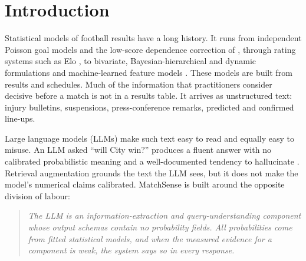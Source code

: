 \documentclass[11pt,a4paper]{article}
\begin{document}
\tableofcontents
\newpage

\section{Introduction}\label{sec:intro}

Statistical models of football results have a long history. It runs from
independent Poisson goal models \citep{maher1982} and the low-score dependence
correction of \citet{dixon1997}, through rating systems such as Elo
\citep{elo1978,hvattum2010}, to bivariate, Bayesian-hierarchical and dynamic
formulations \citep{karlis2003,rue2000,baio2010,koopman2015} and machine-learned
feature models \citep{hubacek2019,bunker2019}. These models are built from
results and schedules. Much of the information that practitioners consider
decisive before a match is not in a results table. It arrives as unstructured
text: injury bulletins, suspensions, press-conference remarks, predicted and
confirmed line-ups.

Large language models (LLMs) make such text easy to read and equally easy to
misuse. An LLM asked ``will City win?'' produces a fluent answer with no
calibrated probabilistic meaning and a well-documented tendency to hallucinate
\citep{ji2023}. Retrieval augmentation \citep{lewis2020} grounds the text the
LLM sees, but it does not make the model's numerical claims calibrated.
MatchSense is built around the opposite division of labour:

\begin{quote}
\emph{The LLM is an information-extraction and query-understanding component
whose output schemas contain no probability fields. All probabilities come from
fitted statistical models, and when the measured evidence for a component is
weak, the system says so in every response.}
\end{quote}
\end{document}
